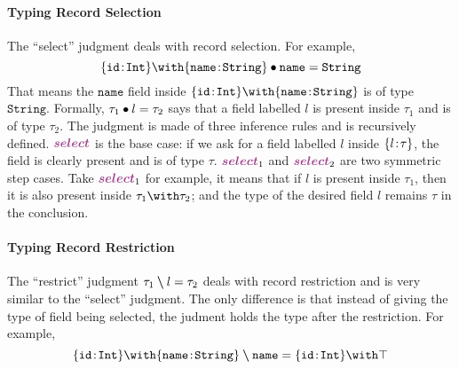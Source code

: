 \paragraph{Typing Record Selection}
The ``select'' judgment deals with record selection. For example,
\[
\judgeselect {\recty {\texttt{id}} \Int \andop \recty {\texttt{name}} \String}
{\texttt{name}} {\String}
\]
That means the $\texttt{name}$ field inside
$\recty {\texttt{id}} \Int \andop \recty {\texttt{name}} \String$ is of type
$\texttt{String}$. Formally, $\tau_1 \bullet l = \tau_2$ says that a field
labelled $l$ is present inside $\tau_1$ and is of type $\tau_2$. The judgment is
made of three inference rules and is recursively defined. $\rulelabelselect$ is
the base case: if we ask for a field labelled $l$ inside $\{ l \!:\! \tau \}$, the
field is clearly present and is of type $\tau$. $\rulelabelselectleft$ and
$\rulelabelselectright$ are two symmetric step cases. Take
$\rulelabelselectleft$ for example, it means that if $l$ is present inside
$\tau_1$, then it is also present inside $\tau_1 \andop \tau_2$; and the type of
the desired field $l$ remains $\tau$ in the conclusion.

\paragraph{Typing Record Restriction}
The ``restrict'' judgment $\tau_1 \bm{\setminus} l = \tau_2$ deals with record
restriction and is very similar to the ``select'' judgment. The only difference
is that instead of giving the type of field being selected, the judment holds
the type after the restriction. For example,
\[
\judgerestrict {\recty {\texttt{id}} \Int \andop \recty {\texttt{name}} \String}
{\texttt{name}} {\recty {\texttt{id}} \Int \andop \top}
\]


